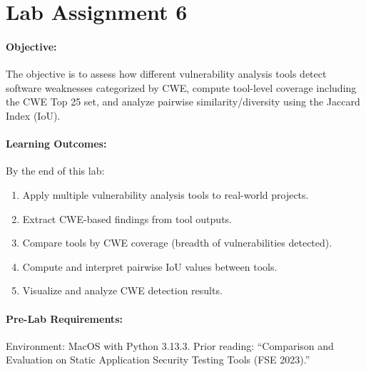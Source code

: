 \section{Lab Assignment 6}
\paragraph{Objective:}

The objective is to assess how different vulnerability analysis tools detect software weaknesses categorized by CWE, compute tool-level coverage including the CWE Top 25 set, and analyze pairwise similarity/diversity using the Jaccard Index (IoU).


\paragraph{Learning Outcomes:}

By the end of this lab:
\begin{enumerate}
    \item Apply multiple vulnerability analysis tools to real-world projects.
    \item Extract CWE-based findings from tool outputs.
    \item Compare tools by CWE coverage (breadth of vulnerabilities detected).
    \item Compute and interpret pairwise IoU values between tools.
    \item Visualize and analyze CWE detection results.
\end{enumerate}

\paragraph{Pre-Lab Requirements:}

Environment: MacOS with Python 3.13.3. Prior reading: ``Comparison and Evaluation on Static Application Security Testing Tools (FSE 2023).''


